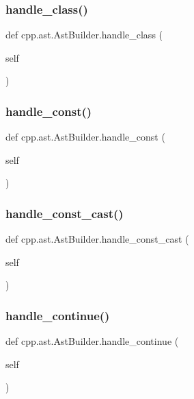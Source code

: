 \subsubsection{\texorpdfstring{handle\_class()}{handle\_class()}}
{\footnotesize\ttfamily def cpp.\+ast.\+Ast\+Builder.\+handle\+\_\+class (\begin{DoxyParamCaption}\item[{}]{self }\end{DoxyParamCaption})}

\mbox{\label{classcpp_1_1ast_1_1AstBuilder_a9d24135000a6fb4a3daabb5ab8883648}} 
\subsubsection{\texorpdfstring{handle\_const()}{handle\_const()}}
{\footnotesize\ttfamily def cpp.\+ast.\+Ast\+Builder.\+handle\+\_\+const (\begin{DoxyParamCaption}\item[{}]{self }\end{DoxyParamCaption})}

\mbox{\label{classcpp_1_1ast_1_1AstBuilder_a4dae74f1d036f63fc1080962ab0208fc}} 
\subsubsection{\texorpdfstring{handle\_const\_cast()}{handle\_const\_cast()}}
{\footnotesize\ttfamily def cpp.\+ast.\+Ast\+Builder.\+handle\+\_\+const\+\_\+cast (\begin{DoxyParamCaption}\item[{}]{self }\end{DoxyParamCaption})}

\mbox{\label{classcpp_1_1ast_1_1AstBuilder_a511eb003ed301a713a687e5293584077}} 
\subsubsection{\texorpdfstring{handle\_continue()}{handle\_continue()}}
{\footnotesize\ttfamily def cpp.\+ast.\+Ast\+Builder.\+handle\+\_\+continue (\begin{DoxyParamCaption}\item[{}]{self }\end{DoxyParamCaption})}

